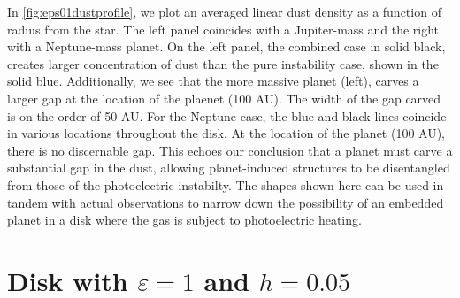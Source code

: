 \documentclass[onecolumn]{report}
\newcommand{\epsi}{\varepsilon}
\begin{document}
In \ref{fig:eps01dustprofile}, we plot an averaged linear dust density as a function of radius from the star. The left panel coincides with a Jupiter-mass and the right with a Neptune-mass planet. On the left panel, the combined case in solid black, creates larger concentration of dust than the pure instability case, shown in the solid blue. Additionally, we see that the more massive planet (left), carves a larger gap at the location of the plaenet (100 AU). The width of the gap carved is on the order of 50 AU. For the Neptune case, the blue and black lines coincide in various locations throughout the disk. At the location of the planet (100 AU), there is no discernable gap. This echoes our conclusion that a planet must carve a substantial gap in the dust, allowing planet-induced structures to be disentangled from those of the photoelectric instabilty. The shapes shown here can be used in tandem with actual observations to narrow down the possibility of an embedded planet in a disk where the gas is subject to photoelectric heating.

\section{Disk with $\epsi=1$ and $h=0.05$}
\end{document}
